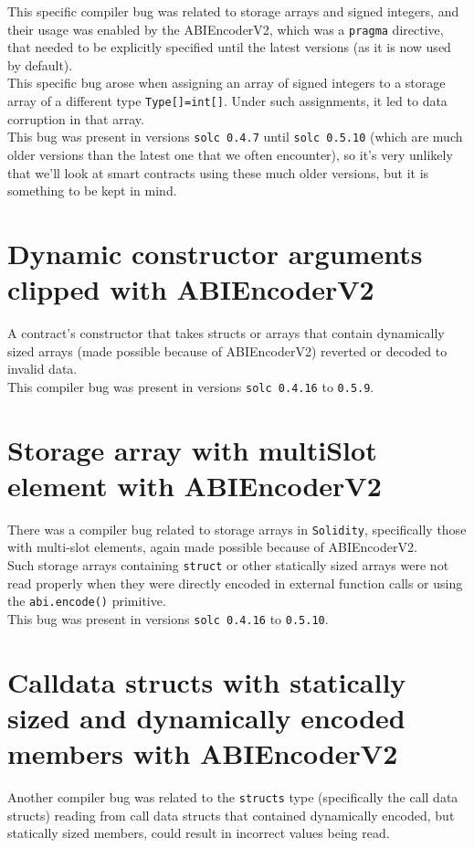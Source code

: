 This specific compiler bug was related to storage arrays and signed integers, and their usage was enabled by the ABIEncoderV2, which was a \texttt{pragma} directive, that needed to be explicitly specified until the latest versions (as it is now used by default). \\

This specific bug arose when assigning an array of signed integers to a storage array of a different type \texttt{Type[]=int[]}. Under such assignments, it led to data corruption in that array.\\

This bug was present in versions \texttt{solc 0.4.7} until \texttt{solc 0.5.10} (which are much older versions than the latest one that we often encounter), so it's very unlikely that we'll look at smart contracts using these much older versions, but it is something to be kept in mind.

\section{Dynamic constructor arguments clipped with ABIEncoderV2}
A contract's constructor that takes structs or arrays that contain dynamically sized arrays (made possible because of ABIEncoderV2) reverted or decoded to invalid data. \\

This compiler bug was present in versions \texttt{solc 0.4.16} to \texttt{0.5.9}.

\section{Storage array with multiSlot element with ABIEncoderV2}
There was a compiler bug related to storage arrays in \texttt{Solidity}, specifically those with multi-slot elements, again made possible because of ABIEncoderV2. \\

Such storage arrays containing \texttt{struct} or other statically sized arrays were not read properly when they were directly encoded in external function calls or using the \texttt{abi.encode()} primitive. \\

This bug was present in versions \texttt{solc 0.4.16} to \texttt{0.5.10}.

\section{Calldata structs with statically sized and dynamically encoded members with ABIEncoderV2}
Another compiler bug was related to the \texttt{structs} type (specifically the call data structs) reading from call data structs that contained dynamically encoded, but statically sized members, could result in incorrect values being read. \\

